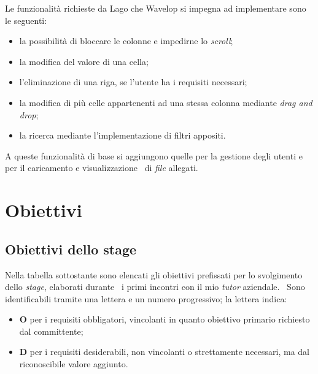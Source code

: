 Le funzionalità richieste da Lago che Wavelop si impegna ad implementare sono le seguenti: \
\begin{itemize}
  \item la possibilità di bloccare le colonne e impedirne lo \emph{scroll};
  \item la modifica del valore di una cella;
  \item l'eliminazione di una riga, se l'utente ha i requisiti necessari;
  \item la modifica di più celle appartenenti ad una stessa colonna mediante \emph{drag and drop};
  \item la ricerca mediante l'implementazione di filtri appositi.
\end{itemize}
A queste funzionalità di base si aggiungono quelle per la gestione degli utenti e per il caricamento e visualizzazione \
di \emph{file} allegati. 

\section{Obiettivi}

\subsection{Obiettivi dello stage}
Nella tabella sottostante sono elencati gli obiettivi prefissati per lo svolgimento dello \emph{stage}, elaborati durante \
i primi incontri con il mio \emph{tutor} aziendale. \
Sono identificabili tramite una lettera e un numero progressivo; la lettera indica:
\begin{itemize}
  \item \textbf{O} per i requisiti obbligatori, vincolanti in quanto obiettivo primario richiesto dal committente;
  \item \textbf{D} per i requisiti desiderabili, non vincolanti o strettamente necessari, ma dal riconoscibile valore aggiunto.
\end{itemize}

